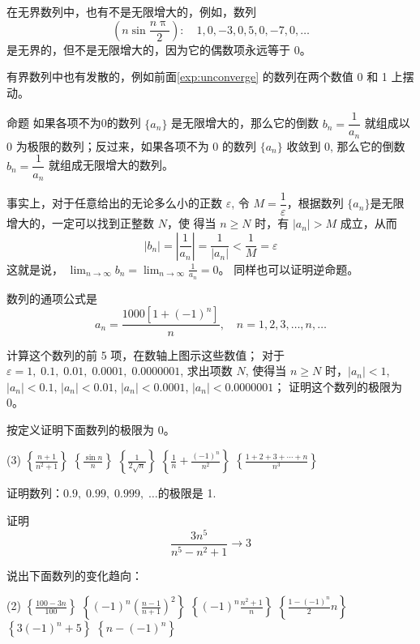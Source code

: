 \medskip
在无界数列中，也有不是无限增大的，例如，数列
\[\left(n\sin\frac{n\uppi}{2}\right):\quad 1,0,-3,0,5,0,-7,0,\ldots\]
是无界的，但不是无限增大的，因为它的偶数项永远等于 0。

有界数列中也有发散的，例如前面\cref{exp:unconverge} 的数列在两个数值 0 和 1 上摆动。

\begin{Theorem}{命题}
  如果各项不为0的数列 $\{a_n\}$ 是无限增大的，那么它的倒数 $b_n=\dfrac{1}{a_n}$ 
就组成以 0 为极限的数列；反过来，如果各项不为 0 的数列 $\{a_n\}$ 收敛到 0, 那么它的倒数 $b_n=\dfrac{1}{a_n}$ 就组成无限增大的数列。
\end{Theorem}
 
事实上，对于任意给出的无论多么小的正数 $\varepsilon$, 令 $M=\dfrac{1}{\varepsilon}$，根据数列 $\{a_n\}$是无限增大的，一定可以找到正整数 $N$，使
得当 $n\geqslant N$ 时，有 $|a_n|>M$ 成立，从而
\[|b_n|=\left|\frac{1}{a_n}\right|=\frac{1}{|a_n|}<\frac{1}{M}=\varepsilon\]
这就是说，
$\displaystyle \lim_{n\to\infty}b_n=\lim_{n\to\infty}\frac{1}{a_n}=0$。
同样也可以证明逆命题。

\begin{Exercise}
\begin{question}
  \item 数列的通项公式是
  \[a_n=\frac{1000[1+(-1)^n]}{n},\quad n=1,2,3,\ldots,n,\ldots\]
  \begin{tasks}
      \task 计算这个数列的前 5 项，在数轴上图示这些数值；
      \task 对于 $\varepsilon=1,\; 0.1,\; 0.01,\; 0.0001,\; 0.0000001$, 求出项数 $N$, 使得当 $n\geqslant N$ 时，$|a_n|<1$, $|a_n|<0.1$, $|a_n|<0.01$, $|a_n|<0.0001$, $|a_n|<0.0000001$；
      \task 证明这个数列的极限为 0。
  \end{tasks}
  \item 按定义证明下面数列的极限为 0。
  \begin{tasks}(3)
    \task $\displaystyle \left\{\frac{n+1}{n^2+1}\right\}$
    \task $\displaystyle \left\{\frac{\sin n}{n}\right\}$
    \task $\displaystyle \left\{\frac{1}{2\sqrt{n}}\right\}$
    \task $\displaystyle \left\{\frac{1}{n}+\frac{(-1)^n}{n^2}\right\}$
    \task* $\displaystyle \left\{\frac{1+2+3+\cdots+n}{n^3}\right\}$
  \end{tasks}
    \item 证明数列：$0.9,\;0.99,\;0.999,\;\ldots$的极限是 1.
    \item 证明 \[\displaystyle \frac{3n^5}{n^5-n^2+1}\to 3\]
    \item 说出下面数列的变化趋向：
  \begin{tasks}(2)
    \task $\displaystyle \left\{\frac{100-3n}{100}\right\}$
    \task $\displaystyle \left\{(-1)^n\left(\frac{n-1}{n+1}\right)^2\right\}$
    \task $\displaystyle \left\{(-1)^n\frac{n^2+1}{n}\right\}$
    \task $\displaystyle \left\{\frac{1-(-1)^n}{2}n\right\}$
    \task $\displaystyle \left\{3(-1)^n+5\right\}$
    \task $\displaystyle \left\{n-(-1)^n\right\}$
  \end{tasks}
\end{question}
\end{Exercise}

